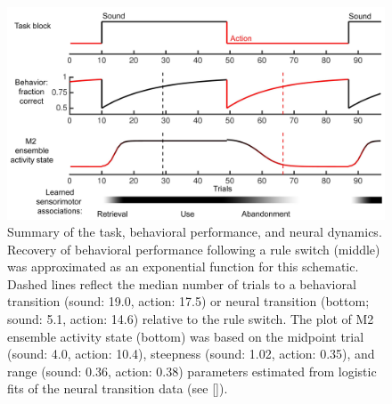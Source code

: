 \begin{figure}[htbp]

\begin{center}
\includegraphics[width=\textwidth]{Figures/NN_figS9.jpg} 
\end{center}

\caption[Summary of the task, behavioral performance, and neural dynamics.]
{Summary of the task, behavioral performance, and neural dynamics. Recovery of behavioral performance following a rule switch (middle) was approximated as an exponential function for this schematic. Dashed lines reflect the median number of trials to a behavioral transition (sound: 19.0, action: 17.5) or neural transition (bottom; sound: 5.1, action: 14.6) relative to the rule switch. The plot of M2 ensemble activity state (bottom) was based on the midpoint trial (sound: 4.0, action: 10.4), steepness (sound: 1.02, action: 0.35), and range (sound: 0.36, action: 0.38) parameters estimated from logistic fits of the neural transition data (see \ref{}).
}

\label{fig:NN_fig8}
\end{figure}